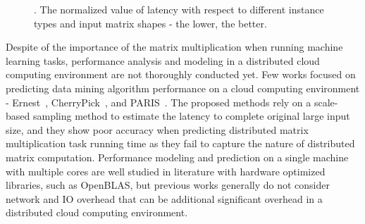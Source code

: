 \documentclass[10pt, conference, compsocconf]{IEEEtran}
\begin{document}
\begin{figure}[t]
  \centering
  \hfil\hfil\hfil\hfil\hfil\hfil\hfil\hfil\hfil\hfil{}
  \caption{\label{fig:instance-blocks-sizes-compare}. The normalized value of latency with respect to different instance types and input matrix shapes - the lower, the better.}
\end{figure}

Despite of the importance of the matrix multiplication when running machine learning tasks, performance analysis and modeling in a distributed cloud computing environment are not thoroughly conducted yet. Few works focused on predicting data mining algorithm performance on a cloud computing environment - Ernest~\cite{ernest}, CherryPick~\cite{cherrypick}, and PARIS~\cite{paris}. The proposed methods rely on a scale-based sampling method to estimate the latency to complete original large input size, and they show poor accuracy when predicting distributed matrix multiplication task running time as they fail to capture the nature of distributed matrix computation. Performance modeling and prediction on a single machine with multiple cores are well studied in literature with hardware optimized libraries, such as OpenBLAS, but previous works generally do not consider network and IO overhead that can be additional significant overhead in a distributed cloud computing environment.
\end{document}
